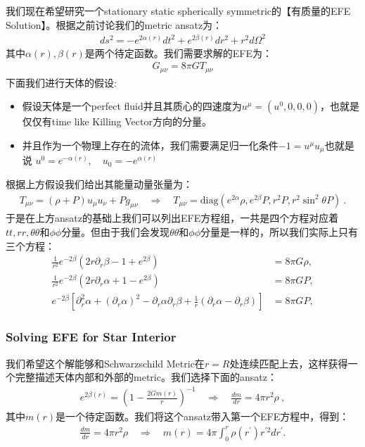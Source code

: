 我们现在希望研究一个stationary static spherically symmetric的【有质量的EFE
Solution】。根据之前讨论我们的metric ansatz为：
\begin{align}
  ds^2 = -e^{2\alpha(r)}dt^2+e^{2\beta(r)}dr^2+r^2d\Omega^2
\end{align}
其中$ \alpha(r),\beta(r) $是两个待定函数。我们需要求解的EFE为：
\begin{align}
  G_{\mu\nu} = 8\pi G T_{\mu\nu}
\end{align}
下面我们进行天体的假设:
\begin{itemize}
  \item 假设天体是一个perfect fluid并且其质心的四速度为$ u^\mu = (u^0,0,0,0)
    $，也就是仅仅有time like Killing Vector方向的分量。
  \item 并且作为一个物理上存在的流体，我们需要满足归一化条件$ -1 = u^\mu u_\mu $也就是说 $ u^0 =
    e^{-\alpha(r)}, \quad u_0 = -e^{\alpha(r)}$
\end{itemize}
根据上方假设我们给出其能量动量张量为：
\begin{align}
  T_{\mu\nu} = (\rho + P) u_\mu u_\nu + P g_{\mu\nu} \quad
  \Rightarrow \quad
  T_{\mu\nu}=\mathrm{diag}\left(e^{2\alpha}\rho,e^{2\beta}P,r^2P,r^2\sin^2\theta
  P\right)\mathrm{~.}
\end{align}
于是在上方ansatz的基础上我们可以列出EFE方程组，一共是四个方程对应着$ tt, rr, \theta \theta $和$
\phi \phi $分量。但由于我们会发现$ \theta \theta $和$ \phi \phi $分量是一样的，所以我们实际上只有三个方程：
\begin{align}
  \frac{1}{r^2}e^{-2\beta}\left(2r\partial_r\beta-1+e^{2\beta}\right)&=8\pi
  G\rho,\\
  \frac{1}{r^2}e^{-2\beta}\left(2r\partial_r\alpha+1-e^{2\beta}\right)&=8\pi
  GP,\\
  e^{-2\beta}\left[\partial_r^2\alpha+(\partial_r\alpha)^2-\partial_r\alpha\partial_r\beta+\frac{1}{r}(\partial_r\alpha-\partial_r\beta)\right]&=8\pi
  GP,
\end{align}

\subsubsection{Solving EFE for Star Interior}

\bigskip
{}

我们希望这个解能够和Schwarzschild Metric在$ r=R
$处连续匹配上去，这样获得一个完整描述天体内部和外部的metric。我们选择下面的ansatz：
\begin{align}
  e^{2\beta(r)}=\left(1-\frac{2Gm(r)}{r}\right)^{-1} \quad
  \Rightarrow \quad \frac{dm}{dr}=4\pi r^2\rho\mathrm{~,}
\end{align}
其中$ m(r) $是一个待定函数。我们将这个ansatz带入第一个EFE方程中，得到：
\begin{align}
  \frac{dm}{dr}=4\pi r^2\rho \quad \Rightarrow \quad
  m(r)=4\pi\int_0^r\rho(r^{\prime})r^{\prime2}dr^{\prime}.
\end{align}

